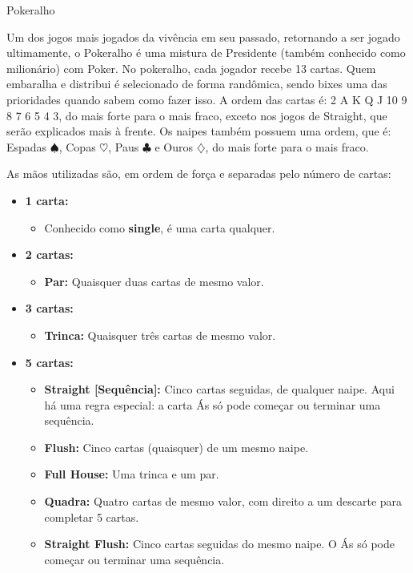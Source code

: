 \begin{subsecao}{Pokeralho}

Um dos jogos mais jogados da vivência em seu passado, retornando a ser jogado
ultimamente, o Pokeralho é uma mistura de Presidente (também conhecido como
milionário) com Poker. No pokeralho, cada jogador recebe 13 cartas. Quem
embaralha e distribui é selecionado de forma randômica, sendo bixes uma das
prioridades quando sabem como fazer isso. A ordem das cartas é: 2 A K Q J 10
9 8 7 6 5 4 3, do mais forte para o mais fraco, exceto nos jogos de Straight,
que serão explicados mais à frente. Os naipes também possuem uma ordem, que é:
Espadas $\spadesuit$, Copas $\heartsuit$, Paus $\clubsuit$ e Ouros $\diamondsuit$,
do mais forte para o mais fraco.

As mãos utilizadas são, em ordem de força e separadas pelo número de cartas:

\begin{itemize}

\item \textbf {1 carta:}
\begin{itemize}
\item Conhecido como \textbf{single}, é uma carta qualquer.
\end{itemize}
\item \textbf {2 cartas:}
\begin{itemize}

\item \textbf{Par:} Quaisquer duas cartas de mesmo valor.
\end{itemize}
\item \textbf {3 cartas:}

\begin{itemize}
\item \textbf{Trinca:} Quaisquer três cartas de mesmo valor.
\end{itemize}
\item \textbf {5 cartas:}

\begin{itemize}
\item \textbf{Straight [Sequência]:} Cinco cartas seguidas, de qualquer naipe.
Aqui há uma regra especial: a carta Ás só pode começar ou terminar uma
sequência.
\item \textbf{Flush:} Cinco cartas (quaisquer) de um mesmo naipe.
\item \textbf{Full House:} Uma trinca e um par.
\item \textbf{Quadra:} Quatro cartas de mesmo valor, com direito a um descarte
para completar 5 cartas.
\item \textbf{Straight Flush:} Cinco cartas seguidas do mesmo naipe. O Ás só
pode começar ou terminar uma sequência. 
\end{itemize}


\end{itemize}
\end{subsecao}
